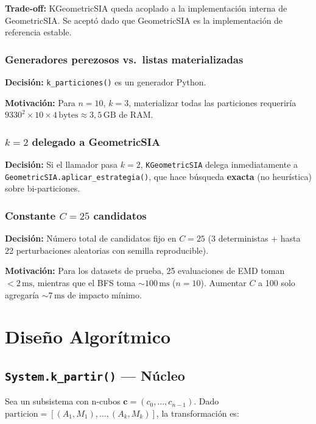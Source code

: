 \documentclass[12pt,letterpaper]{article}
\theoremstyle{definition}
\theoremstyle{remark}
\begin{document}
\textbf{Trade-off:} KGeometricSIA queda acoplado a la implementación interna de
GeometricSIA. Se aceptó dado que GeometricSIA es la implementación de referencia estable.

\subsubsection{Generadores perezosos vs.\ listas materializadas}
\textbf{Decisión:} \texttt{k\_particiones()} es un generador Python.

\textbf{Motivación:} Para $n=10$, $k=3$, materializar todas las particiones requeriría
$9330^2 \times 10 \times 4\,\text{bytes} \approx 3{,}5\,\text{GB}$ de RAM.

\subsubsection{$k=2$ delegado a GeometricSIA}
\textbf{Decisión:} Si el llamador pasa $k=2$, \texttt{KGeometricSIA} delega
inmediatamente a \texttt{GeometricSIA.\allowbreak{}aplicar\_estrategia()},
que hace búsqueda \textbf{exacta} (no heurística) sobre bi-particiones.

\subsubsection{Constante $C = 25$ candidatos}
\textbf{Decisión:} Número total de candidatos fijo en $C = 25$
(3 deterministas + hasta 22 perturbaciones aleatorias con semilla reproducible).

\textbf{Motivación:} Para los datasets de prueba, 25 evaluaciones de EMD toman
$< 2\,\text{ms}$, mientras que el BFS toma $\sim 100\,\text{ms}$ ($n=10$). Aumentar
$C$ a 100 solo agregaría $\sim 7\,\text{ms}$ de impacto mínimo.

\section{Diseño Algorítmico}
\label{sec:diseno}

\subsection{\texorpdfstring{\texttt{System.k\_partir()}}{System.k\_partir()} --- Núcleo}

Sea un subsistema con n-cubos $\mathbf{c} = (c_0, \ldots, c_{n-1})$. Dado
$\mathrm{particion} = [(A_1, M_1), \ldots, (A_k, M_k)]$, la transformación es:
\end{document}
